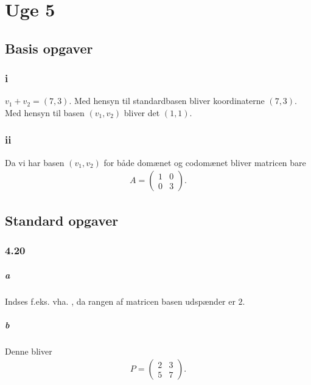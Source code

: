 
\chapter{Uge 5}

	\section{Basis opgaver}

		\subsection{i}

			$v_1+v_2=(7,3)$. Med hensyn til standardbasen bliver koordinaterne $(7,3)$. Med hensyn til basen $(v_1,v_2)$ bliver det $(1,1)$.

		\subsection{ii}

			Da vi har basen $(v_1,v_2)$ for både domænet og codomænet bliver matricen bare
				\begin{align*}
					A=\left(\begin{array}{rr} {1} & {0} \\ {0} & {3} \end{array}\right).
				\end{align*}

	\section{Standard opgaver}

		\subsection{4.20}

			\paragraph{a} Indses f.eks. vha. \cite[Korollar 4.3.12]{hesselholt2017}, da rangen af matricen basen udspænder er $2$.

			\paragraph{b} Denne bliver 
				\begin{align*}
					P=\left(\begin{array}{rr} {2} & {3} \\ {5} & {7} \end{array}\right).
				\end{align*}

